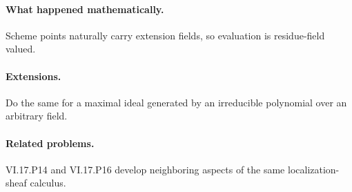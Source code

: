 \paragraph{What happened mathematically.}
Scheme points naturally carry extension fields, so evaluation is residue-field valued.

\paragraph{Extensions.}
Do the same for a maximal ideal generated by an irreducible polynomial over an arbitrary field.

\paragraph{Related problems.}
VI.17.P14 and VI.17.P16 develop neighboring aspects of the same localization-sheaf calculus.
\fi
